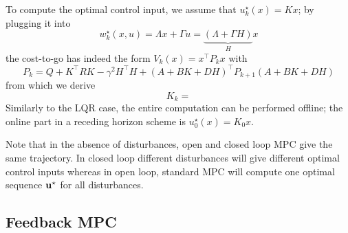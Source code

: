 To compute the optimal control input, we assume that $u_k^\star(x)=Kx$; by plugging it into
\begin{equation*}
  w_k^\star(x,u) = \Lambda x + \Gamma u = \underbrace{(\Lambda + \Gamma H)}_{H}x
\end{equation*}
the cost-to-go has indeed the form $V_k(x) = x^\top P_kx$ with
\begin{equation*}
  P_k = Q + K^\top RK -\gamma^2 H^\top H + (A+BK+DH)^\top P_{k+1}(A+BK+DH)
\end{equation*}
from which we derive
\begin{equation*}
  K_k =
\end{equation*}
Similarly to the LQR case, the entire computation can be performed offline; the online part in a receding horizon scheme is $u_0^\star(x) = K_0x$.

Note that in the absence of disturbances, open and closed loop MPC give the same trajectory. In closed loop different disturbances will give different optimal control inputs whereas in open loop, standard MPC will compute one optimal sequence $\boldsymbol{\mathrm{u}}^\star$ for all disturbances.

\subsection{Feedback MPC}
\label{sec:feedback-MPC}

